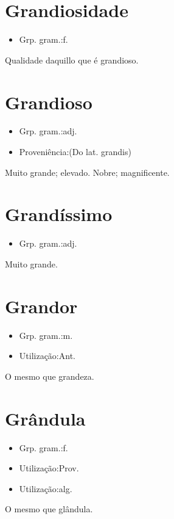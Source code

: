 \section{Grandiosidade}
\begin{itemize}
\item {Grp. gram.:f.}
\end{itemize}
Qualidade daquillo que é grandioso.
\section{Grandioso}
\begin{itemize}
\item {Grp. gram.:adj.}
\end{itemize}
\begin{itemize}
\item {Proveniência:(Do lat. \textunderscore grandis\textunderscore )}
\end{itemize}
Muito grande; elevado.
Nobre; magnificente.
\section{Grandíssimo}
\begin{itemize}
\item {Grp. gram.:adj.}
\end{itemize}
Muito grande.
\section{Grandor}
\begin{itemize}
\item {Grp. gram.:m.}
\end{itemize}
\begin{itemize}
\item {Utilização:Ant.}
\end{itemize}
O mesmo que \textunderscore grandeza\textunderscore .
\section{Grândula}
\begin{itemize}
\item {Grp. gram.:f.}
\end{itemize}
\begin{itemize}
\item {Utilização:Prov.}
\end{itemize}
\begin{itemize}
\item {Utilização:alg.}
\end{itemize}
O mesmo que \textunderscore glândula\textunderscore .
